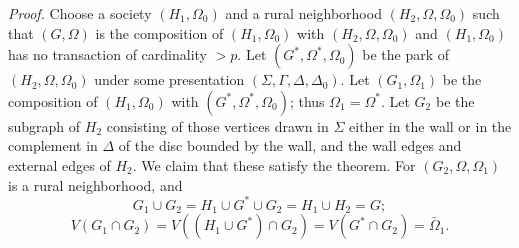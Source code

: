 \textit{Proof.} Choose a society $(H_1, \Omega_0)$ and a rural neighborhood $(H_2, \Omega, \Omega_0)$ such that $(G, \Omega)$ is the composition of $(H_1, \Omega_0)$ with $(H_2, \Omega, \Omega_0)$ and $(H_1, \Omega_0)$ has no transaction of cardinality $> p$. Let $(G^*, \Omega^*, \Omega_0)$ be the park of $(H_2, \Omega, \Omega_0)$ under some presentation $(\Sigma, \Gamma, \Delta, \Delta_0)$. Let $(G_1, \Omega_1)$ be the composition of $(H_1, \Omega_0)$ with $(G^*, \Omega^*, \Omega_0)$; thus $\Omega_1 = \Omega^*$. Let $G_2$ be the subgraph of $H_2$ consisting of those vertices drawn in $\Sigma$ either in the wall or in the complement in $\Delta$ of the disc bounded by the wall, and the wall edges and external edges of $H_2$. We claim that these satisfy the theorem. For $(G_2, \Omega, \Omega_1)$ is a rural neighborhood, and
\begin{equation*}
G_1 \cup G_2 = H_1 \cup G^* \cup G_2 = H_1 \cup H_2 = G;
\end{equation*}
\begin{equation*}
V(G_1 \cap G_2) = V((H_1 \cup G^*) \cap G_2) = V(G^* \cap G_2) = \bar{\Omega}_1.
\end{equation*}

